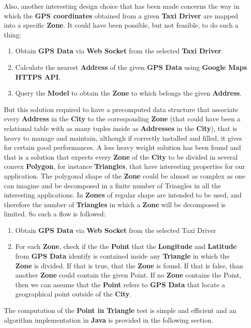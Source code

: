 Also, another interesting design choice that has been made concerns the way in which the \textbf{GPS coordinates} obtained from a given \textbf{Taxi Driver} are mapped into a specific \textbf{Zone}.
It could have been possible, but not feasible, to do such a thing:
\begin{enumerate}
	\item Obtain \textbf{GPS Data} via \textbf{Web Socket} from the selected \textbf{Taxi Driver}.
	\item Calculate the nearest \textbf{Address} of the given \textbf{GPS Data} using \textbf{Google Maps HTTPS API}.
	\item Query the \textbf{Model} to obtain the \textbf{Zone} to which belongs the given \textbf{Address}.
\end{enumerate}
But this solution required to have a precomputed data structure that associate every \textbf{Address} in the \textbf{City} to the corresponding \textbf{Zone} (that could have been a relational table with as many tuples inside as \textbf{Addresses} in the \textbf{City}), that is heavy to manage and maintain, although if correctly installed and filled, it gives for certain good performances.
A less heavy weight solution has been found and that is a solution that expects every \textbf{Zone} of the \textbf{City} to be divided in several convex \textbf{Polygon}, for instance \textbf{Triangles}, that have interesting properties for our application.
The polygonal shape of the \textbf{Zone} could be almost as complex as one can imagine and be decomposed in a finite number of Triangles in all the interesting applications.
In \myTaxiService{} \textbf{Zones} of regular shape are intended to be used, and therefore the number of \textbf{Triangles} in which a \textbf{Zone} will be decomposed is limited.
So such a flow is followed:
\begin{enumerate}
	\item Obtain \textbf{GPS Data} via \textbf{Web Socket} from the selected Taxi Driver
	\item For each \textbf{Zone}, check if the the \textbf{Point} that the \textbf{Longitude} and \textbf{Latitude} from \textbf{GPS Data} identify is contained inside any \textbf{Triangle} in which the \textbf{Zone} is divided. If that is true, that the \textbf{Zone} is found. If that is false, than another \textbf{Zone} could contain the given Point. If no \textbf{Zone} contains the Point, then we can assume that the \textbf{Point} refers to \textbf{GPS Data} that locate a geographical point outside of the \textbf{City}.
\end{enumerate}
The computation of the \textbf{Point in Triangle} test is simple and efficient and an algorithm implementation in \textbf{Java} is provided in the following section.
